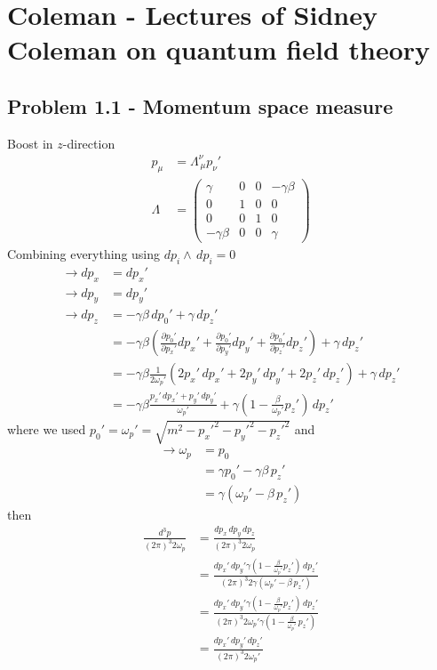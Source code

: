\documentclass[../main.tex]{subfiles}
\begin{document}
\section{{\sc Coleman} - Lectures of Sidney Coleman on quantum field theory}
\subsection{Problem 1.1 - Momentum space measure}
Boost in $z$-direction
\begin{align}
p_\mu&=\Lambda^\nu_{\,\mu}p_\nu'\\ 
\Lambda&=\left(\begin{array}{cccc}
\gamma & 0 & 0 & -\gamma\beta\\
0 & 1 & 0 & 0\\
0 & 0 & 1 & 0\\
-\gamma\beta & 0 & 0 & \gamma
\end{array}\right)
\end{align}
Combining everything using $dp_i\wedge\,dp_i=0$
\begin{align}
\rightarrow dp_x&=dp_x'\\
\rightarrow dp_y&=dp_y'\\
\rightarrow dp_z
&=-\gamma\beta\,dp_0'+\gamma\,dp_z'\\
&=-\gamma\beta\left(\frac{\partial p_0'}{\partial p_x'}dp_x'+\frac{\partial p_0'}{\partial p_y'}dp_y'+\frac{\partial p_0'}{\partial p_z'}dp_z'\right)+\gamma\,dp_z'\\
&=-\gamma\beta\frac{1}{2\omega_p'}(2p_x'\,dp_x'+2p_y'\,dp_y'+2p_z'\,dp_z')+\gamma\,dp_z'\\
&=-\gamma\beta\frac{p_x'\,dp_x'+p_y'\,dp_y'}{\omega_p'}+\gamma\left(1-\frac{\beta}{\omega_p'}p_z'\right)\,dp_z'
\end{align}
where we used $p_0'=\omega_p'=\sqrt{m^2-{p_x'}^2-{p_y'}^2-{p_z'}^2}$ and 
\begin{align}
\rightarrow \omega_p&=p_0\\
&=\gamma p_0'-\gamma\beta\,p_z'\\
&=\gamma(\omega_p'-\beta\,p_z')
\end{align}
then
\begin{align}
\frac{d^3p}{(2\pi)^3 2\omega_p}
&=\frac{dp_x\,dp_y\,dp_z}{(2\pi)^3 2\omega_p}\\
&=\frac{dp_x'\,dp_y'\gamma\left(1-\frac{\beta}{\omega_p'}p_z'\right)\,dp_z'}{(2\pi)^3 2\gamma(\omega_p'-\beta\,p_z')}\\
&=\frac{dp_x'\,dp_y'\gamma\left(1-\frac{\beta}{\omega_p'}p_z'\right)\,dp_z'}{(2\pi)^3 2\omega_p'\gamma\left(1-\frac{\beta}{\omega_p'}\,p_z'\right)}\\
&=\frac{dp_x'\,dp_y'\,dp_z'}{(2\pi)^3 2\omega_p'}
\end{align}
\end{document}

